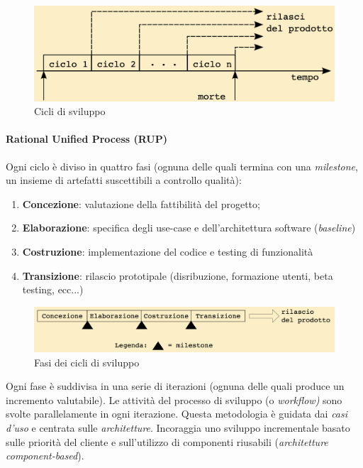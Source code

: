 \begin{figure}[H]
    \centering
    \includegraphics[width=0.75\linewidth]{assets/up.png}
    \caption{Cicli di sviluppo}
    \label{fig:cicli-up}
\end{figure}

\newpage

\paragraph{Rational Unified Process (RUP)} Ogni ciclo è diviso in quattro fasi (ognuna delle quali termina con una \textit{milestone}, un insieme di artefatti suscettibili a controllo qualità):
\begin{enumerate}
    \item \textbf{Concezione}: valutazione della fattibilità del progetto;
    \item \textbf{Elaborazione}: specifica degli use-case e dell'architettura software (\textit{baseline})
    \item \textbf{Costruzione}: implementazione del codice e testing di funzionalità
    \item \textbf{Transizione}: rilascio prototipale (disribuzione, formazione utenti, beta testing, ecc...)
\end{enumerate}

\begin{figure}[H]
    \centering
    \includegraphics[width=0.75\linewidth]{assets/rup.png}
    \caption{Fasi dei cicli di sviluppo}
    \label{fig:fasi-rup}
\end{figure}

Ogni fase è suddivisa in una serie di iterazioni (ognuna delle quali produce un incremento valutabile). Le attività del processo di sviluppo (o \textit{workflow)} sono svolte parallelamente in ogni iterazione. Questa metodologia è guidata dai \textit{casi d'uso} e centrata sulle \textit{architetture}. Incoraggia uno sviluppo incrementale basato sulle priorità del cliente e sull'utilizzo di componenti riusabili (\textit{architetture component-based}).

